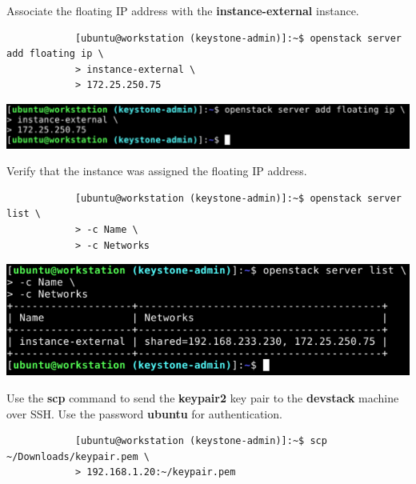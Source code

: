 \documentclass[letterpaper, 12pt]{article}
\begin{document}
\begin{enumerate}
    \begin{labstep}
        Associate the floating IP address with the \textbf{instance-external} instance.
        \begin{lstlisting}
            [ubuntu@workstation (keystone-admin)]:~$ openstack server add floating ip \
            > instance-external \
            > 172.25.250.75
        \end{lstlisting}

        \begin{center}
            \includegraphics[width=\linewidth]{images/part5/step36.png}
        \end{center}
    \end{labstep}

    \begin{labstep}
        Verify that the instance was assigned the floating IP address.
        \begin{lstlisting}
            [ubuntu@workstation (keystone-admin)]:~$ openstack server list \
            > -c Name \
            > -c Networks
        \end{lstlisting}

        \begin{center}
            \includegraphics[width=\linewidth]{images/part5/step37.png}
        \end{center}
    \end{labstep}

    \begin{labstep}
        Use the \textbf{scp} command to send the \textbf{keypair2} key pair to the \textbf{devstack} machine over SSH.
        Use the password \textbf{ubuntu} for authentication.
        \begin{lstlisting}
            [ubuntu@workstation (keystone-admin)]:~$ scp ~/Downloads/keypair.pem \
            > 192.168.1.20:~/keypair.pem
        \end{lstlisting}


\end{labstep}
\end{enumerate}
\end{document}

